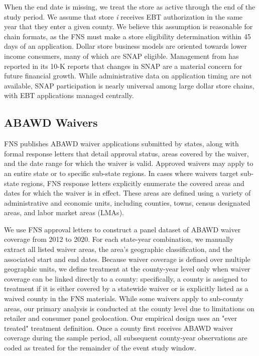 \documentclass[12pt]{article}
\begin{document}
When the end date is missing, we treat the store as active through the end of the study period. We assume that store \textit{i} receives EBT authorization in the same year that they enter a given county. We believe this assumption is reasonable for chain formats, as the FNS must make a store eligibility determination within 45 days of an application. Dollar store business models are oriented towards lower income consumers, many of which are SNAP eligible. Management from   \cite{dollargeneral2025form10k} has reported in its 10-K reports that changes in SNAP are a material concern for future financial growth. While administrative data on application timing are not available, SNAP participation is nearly universal among large dollar store chains, with EBT applications managed centrally.

\subsection{ABAWD Waivers}

FNS publishes ABAWD waiver applications submitted by states, along with formal response letters that detail approval status, areas covered by the waiver, and the date range for which the waiver is valid. Approved waivers may apply to an entire state or to specific sub-state regions. In cases where waivers target sub-state regions, FNS response letters explicitly enumerate the covered areas and dates for which the waiver is in effect. These areas are defined using a variety of administrative and economic units, including counties, towns, census designated areas, and labor market areas (LMAs).

We use FNS approval letters to construct a panel dataset of ABAWD waiver coverage from 2012 to 2020. For each state-year combination, we manually extract all listed waiver areas, the area's geographic classification, and the associated start and end dates. Because waiver coverage is defined over multiple geographic units, we define treatment at the county-year level only when waiver coverage can be linked directly to a county: specifically, a county is assigned to treatment if it is either covered by a statewide waiver or is explicitly listed as a waived county in the FNS materials. While some waivers apply to sub-county areas, our primary analysis is conducted at the county level due to limitations on retailer and consumer panel geolocation. Our empirical design uses an "ever treated" treatment definition. Once a county first receives ABAWD waiver coverage during the sample period, all subsequent county-year observations are coded as treated for the remainder of the event study window. 
\end{document}
